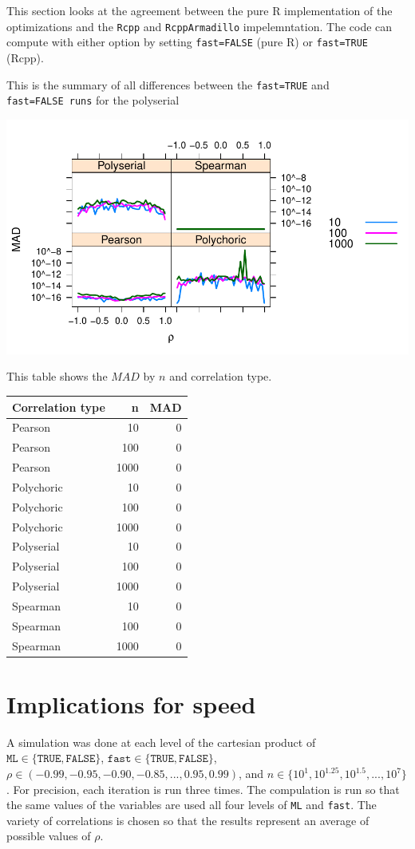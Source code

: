 \documentclass[]{article}
\begin{document}
This section looks at the agreement between the pure R implementation of
the optimizations and the \texttt{Rcpp} and \texttt{RcppArmadillo}
impelemntation. The code can compute with either option by setting
\texttt{fast=FALSE} (pure R) or \texttt{fast=TRUE} (Rcpp).

This is the summary of all differences between the \texttt{fast=TRUE}
and \texttt{fast=FALSE\ runs} for the polyserial

\includegraphics{wCorrArguments_files/figure-latex/unnamed-chunk-3-1.pdf}

This table shows the \(MAD\) by \(n\) and correlation type.

\begin{longtable}[c]{@{}lrr@{}}
\toprule
Correlation type & n & MAD\tabularnewline
\midrule
\endhead
Pearson & 10 & 0\tabularnewline
Pearson & 100 & 0\tabularnewline
Pearson & 1000 & 0\tabularnewline
Polychoric & 10 & 0\tabularnewline
Polychoric & 100 & 0\tabularnewline
Polychoric & 1000 & 0\tabularnewline
Polyserial & 10 & 0\tabularnewline
Polyserial & 100 & 0\tabularnewline
Polyserial & 1000 & 0\tabularnewline
Spearman & 10 & 0\tabularnewline
Spearman & 100 & 0\tabularnewline
Spearman & 1000 & 0\tabularnewline
\bottomrule
\end{longtable}

\section{Implications for speed}\label{implications-for-speed}

A simulation was done at each level of the cartesian product of
\(\mathtt{ML} \in \{\mathtt{TRUE}, \mathtt{FALSE} \}\),
\(\mathtt{fast} \in \{\mathtt{TRUE}, \mathtt{FALSE} \}\),
\(\rho \in \left( -0.99, -0.95, -0.90, -0.85, ..., 0.95, 0.99 \right)\),
and \(n \in \{10^1, 10^{1.25}, 10^{1.5}, ..., 10^7\}\). For precision,
each iteration is run three times. The compulation is run so that the
same values of the variables are used all four levels of \texttt{ML} and
\texttt{fast}. The variety of correlations is chosen so that the results
represent an average of possible values of \(\rho\).
\end{document}
